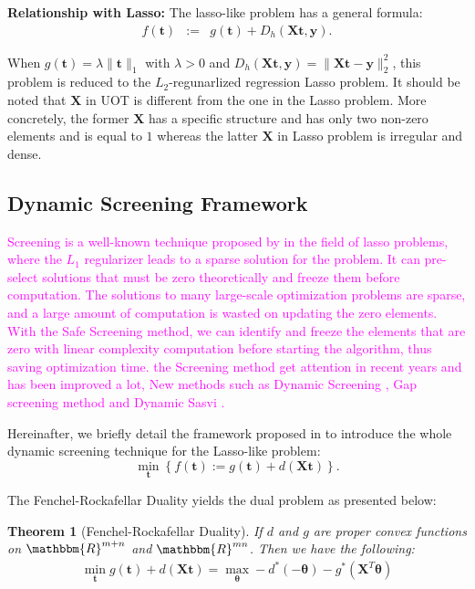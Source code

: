 \documentclass[twoside]{article}
\theoremstyle{plain}
\newtheorem{thm}{Theorem}
\newcommand{\tranT}{T}
\newcommand{\mat}[1]{\mathbf{#1}}
\renewcommand{\vec}[1]{\bm{#1}}
\newcommand{\note}[1]{\textcolor{magenta}{#1}}
\begin{document}
{\bf Relationship with Lasso:} 
The lasso-like problem has a general formula:
%
\begin{eqnarray}
f(\vec{t}) &:=& g(\vec{t}) + D_h(\mat{X} \vec{t},\vec{y}).
\end{eqnarray}

When $g(\vec{t}) = \lambda \|\vec{t}\|_1$ with $\lambda > 0$ and $D_h(\mat{X} \vec{t},\vec{y}) = \|\mat{X} \vec{t}-\vec{y}\|_2^2$, this problem is reduced to the $L_2$-regunarlized regression Lasso problem. It should be noted that $\mat{X}$ in UOT is different from the one in the Lasso problem. More concretely, the former $\mat{X}$ has a specific structure and has only two non-zero elements and is equal to $1$ whereas the latter $\mat{X}$ in Lasso problem is irregular and dense.


\subsection{Dynamic Screening Framework}

\note{Screening is a well-known technique proposed by \citep{ghaoui2010safe} in the field of lasso problems, where the $L_1$ regularizer leads to a sparse solution for the problem. It can pre-select solutions that must be zero theoretically and freeze them before computation. The solutions to many large-scale optimization problems are sparse, and a large amount of computation is wasted on updating the zero elements. With the Safe Screening method, we can identify and freeze the elements that are zero with linear complexity computation before starting the algorithm, thus saving optimization time. the Screening method get attention in recent years and has been improved a lot, New methods such as Dynamic Screening \citep{7128732}, Gap screening method \citep{JMLR:v18:16-577} and Dynamic Sasvi \citep{NEURIPS2021_7b5b23f4}.}

Hereinafter, we briefly detail the framework proposed in \citep{NEURIPS2021_7b5b23f4} to introduce the whole dynamic screening technique for the Lasso-like problem:
\begin{equation}
\label{eq:lassolike}
\min_{\vec{t}} \left\{ f(\vec{t}) := g(\vec{t}) + d(\mat{X} \vec{t}) \right\}.
\end{equation}

The Fenchel-Rockafellar Duality yields the dual problem as presented below:
\begin{thm}[Fenchel-Rockafellar Duality] 
\label{Thm:FRD}
If $d$ and $g$ are proper convex functions on $\mathbbm{R}^{m+n}$ and $\mathbbm{R}^{mn}$. Then we have the following:
 $$
\begin{aligned}
\min_{\vec{t}} g(\vec{t}) + d(\mat{X}\vec{t}) = \max_{\vec{\vec{\theta}}} -d^*(-\vec{\theta})-g^*(\mat{X}^{\tranT}\vec{\theta})
\end{aligned}
$$
\end{thm}
\end{document}

